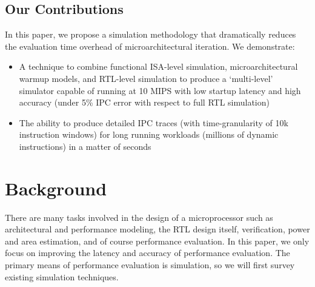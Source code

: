\documentclass[sigplan,nonacm,10pt]{acmart}
\begin{document}
\subsection{Our Contributions}

In this paper, we propose a simulation methodology that dramatically reduces the evaluation time overhead of microarchitectural iteration.
We demonstrate:

\begin{itemize}
  \item A technique to combine functional ISA-level simulation, microarchitectural warmup models, and RTL-level simulation to produce a `multi-level' simulator capable of running at 10 MIPS with low startup latency and high accuracy (under 5\% IPC error with respect to full RTL simulation)
  \item The ability to produce detailed IPC traces (with time-granularity of 10k instruction windows) for long running workloads (millions of dynamic instructions) in a matter of seconds
\end{itemize}

\section{Background}

There are many tasks involved in the design of a microprocessor such as architectural and performance modeling, the RTL design itself, verification, power and area estimation, and of course performance evaluation.
In this paper, we only focus on improving the latency and accuracy of performance evaluation.
The primary means of performance evaluation is simulation, so we will first survey existing simulation techniques.
\end{document}
